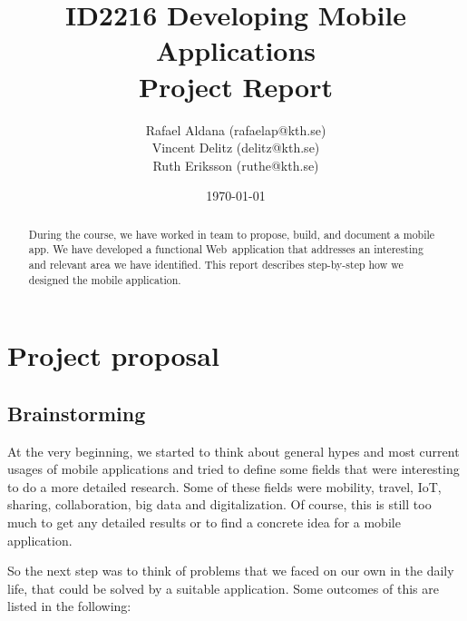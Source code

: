 \documentclass[11pt,twoside,a4paper]{report}
\newcommand{\webOrNative}{Web~}
\begin{document}
\title{ID2216 Developing Mobile Applications\\Project Report}
\author{Rafael Aldana (rafaelap@kth.se)\\Vincent Delitz (delitz@kth.se)\\Ruth Eriksson (ruthe@kth.se)}
\date{\today}
\maketitle

\newpage

\begin{abstract}
During the course, we have worked in team to propose, build, and document a mobile app. We have developed a functional \webOrNative application that addresses an interesting and relevant area we have identified. This report describes step-by-step how we designed the mobile application.
\end{abstract}

\tableofcontents



\newpage

\chapter{Project proposal}

\section{Brainstorming}

At the very beginning, we started to think about general hypes and most current usages of mobile applications and tried to define some fields that were interesting to do a more detailed research. Some of these fields were mobility, travel, IoT, sharing, collaboration, big data and digitalization. Of course, this is still too much to get any detailed results or to find a concrete idea for a mobile application.

So the next step was to think of problems that we faced on our own in the daily life, that could be solved by a suitable application. Some outcomes of this are listed in the following:
\end{document}
